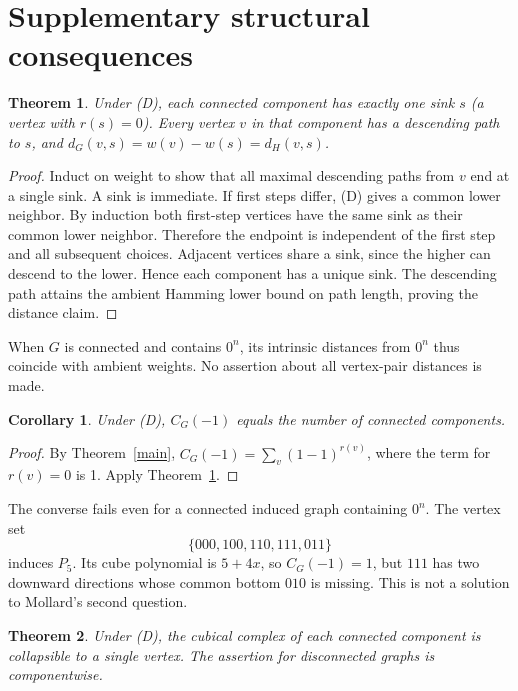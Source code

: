 \documentclass[11pt,a4paper]{article}
\newtheorem{theorem}{Theorem}
\newtheorem{corollary}{Corollary}
\begin{document}
\section{Supplementary structural consequences}
\begin{theorem}\label{sink}
Under (D), each connected component has exactly one sink $s$ (a vertex with $r(s)=0$). Every vertex $v$ in that component has a descending path to $s$, and $d_G(v,s)=w(v)-w(s)=d_H(v,s)$.
\end{theorem}
\begin{proof}
Induct on weight to show that all maximal descending paths from $v$ end at a single sink. A sink is immediate. If first steps differ, (D) gives a common lower neighbor. By induction both first-step vertices have the same sink as their common lower neighbor. Therefore the endpoint is independent of the first step and all subsequent choices. Adjacent vertices share a sink, since the higher can descend to the lower. Hence each component has a unique sink. The descending path attains the ambient Hamming lower bound on path length, proving the distance claim.
\end{proof}
When $G$ is connected and contains $0^n$, its intrinsic distances from $0^n$ thus coincide with ambient weights. No assertion about all vertex-pair distances is made.
\begin{corollary}
Under (D), $C_G(-1)$ equals the number of connected components.
\end{corollary}
\begin{proof}
By Theorem~\ref{main}, $C_G(-1)=\sum_v(1-1)^{r(v)}$, where the term for $r(v)=0$ is 1. Apply Theorem~\ref{sink}.
\end{proof}
The converse fails even for a connected induced graph containing $0^n$. The vertex set
\[\{000,100,110,111,011\}\]
induces $P_5$. Its cube polynomial is $5+4x$, so $C_G(-1)=1$, but $111$ has two downward directions whose common bottom $010$ is missing. This is not a solution to Mollard's second question.
\begin{theorem}\label{collapse}
Under (D), the cubical complex of each connected component is collapsible to a single vertex. The assertion for disconnected graphs is componentwise.
\end{theorem}
\end{document}
